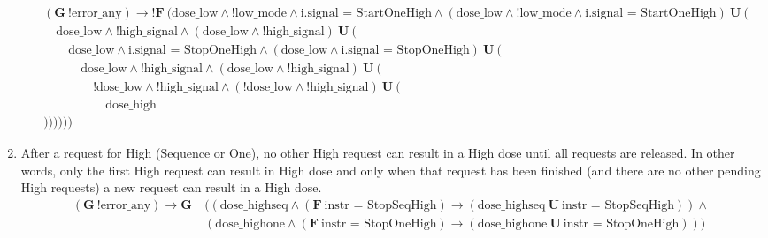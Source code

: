 \documentclass[a4paper,10pt]{article}
\newcommand{\LTLG}{\mathbf{G~}}
\newcommand{\LTLF}{\mathbf{F~}}
\newcommand{\LTLU}{\mathbf{~U~}}
\newcommand{\imply}{\rightarrow}
\newcommand{\doselow}{\textrm{dose\_low}}
\newcommand{\dosehigh}{\textrm{dose\_high}}
\newcommand{\dosehighseq}{\textrm{dose\_highseq}}
\newcommand{\dosehighone}{\textrm{dose\_highone}}
\newcommand{\highsignal}{\textrm{high\_signal}}
\newcommand{\errorany}{\textrm{error\_any}}
\newcommand{\lowmode}{\textrm{low\_mode}}
\begin{document}
\begin{enumerate}
\begin{align*}
				&(\LTLG !\errorany) \imply !\LTLF (\doselow \land !\lowmode \land \textrm{i.signal = StartOneHigh} \land (\doselow \land !\lowmode \land \textrm{i.signal = StartOneHigh}) \LTLU ( \\
				&	\hspace{1em}\doselow \land !\highsignal \land (\doselow \land !\highsignal) \LTLU ( \\
				&		\hspace{2em}\doselow \land \textrm{i.signal = StopOneHigh} \land (\doselow \land \textrm{i.signal = StopOneHigh}) \LTLU ( \\
				&			\hspace{3em}\doselow \land !\highsignal \land (\doselow \land !\highsignal) \LTLU ( \\
				&				\hspace{4em}!\doselow \land !\highsignal \land (!\doselow \land !\highsignal) \LTLU ( \\
				&					\hspace{5em}\dosehigh \\
				&))))))
			\end{align*}

		\item After a request for High (Sequence or One), no other High request can result in a High dose until all requests are released. In other words, only the first High request can result in High dose and only when that request has been finished (and there are no other pending High requests) a new request can result in a High dose.
			\begin{align*}
				(\LTLG !\errorany) \imply \LTLG &((\dosehighseq \land (\LTLF \textrm{instr = StopSeqHigh}) \imply (\dosehighseq \LTLU \textrm{instr = StopSeqHigh})) \land \\
					&(\dosehighone \land (\LTLF \textrm{instr = StopOneHigh}) \imply (\dosehighone \LTLU \textrm{instr = StopOneHigh})))
			\end{align*}


\end{enumerate}
\end{document}
